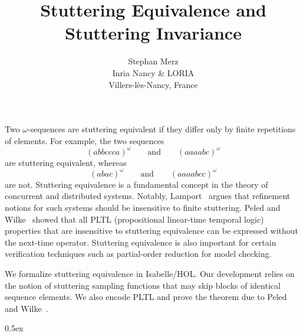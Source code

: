 \documentclass[11pt,a4paper]{article}
\begin{document}
\title{Stuttering Equivalence and Stuttering Invariance}
\author{
  Stephan Merz\\
  Inria Nancy \& LORIA\\
  Villers-l\`es-Nancy, France
}
\maketitle

\noindent%
Two $\omega$-sequences are stuttering equivalent if they differ only by
finite repetitions of elements. For example, the two sequences
\[
  (abbccca)^{\omega} \qquad\textrm{and}\qquad
  (aaaabc)^{\omega}
\]
are stuttering equivalent, whereas
\[
  (abac)^{\omega} \qquad\textrm{and}\qquad
  (aaaabcc)^{\omega}
\]
are not. Stuttering equivalence is a fundamental concept in the theory
of concurrent and distributed systems. Notably, Lamport~\cite{lamport:what-good}
argues that refinement notions for such systems should be insensitive to
finite stuttering. Peled and Wilke~\cite{peled:ltl-x} showed that all PLTL
(propositional linear-time temporal logic) properties that are insensitive 
to stuttering equivalence can be expressed without the next-time operator. 
Stuttering equivalence is also important for certain verification techniques
such as partial-order reduction for model checking.

We formalize stuttering equivalence in Isabelle/HOL. Our development relies
on the notion of stuttering sampling functions that may skip blocks of 
identical sequence elements. We also encode PLTL and prove the theorem
due to Peled and Wilke~\cite{peled:ltl-x}.


\tableofcontents

\parindent 0pt\parskip 0.5ex





\end{document}
